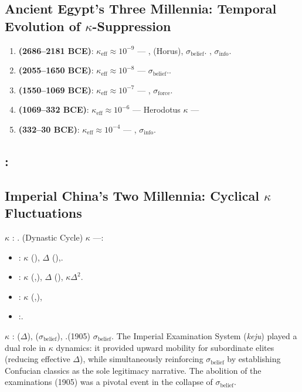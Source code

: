 \documentclass[11pt,a4paper]{article}
\theoremstyle{definition}
\newcommand{\coupling}{\kappa}
\newcommand{\suppress}{\sigma}
\begin{document}
\subsection{Ancient Egypt's Three Millennia: Temporal Evolution of $\coupling$-Suppression}
\begin{enumerate}
 \item \textbf{ (2686--2181 BCE)}: 
 $\coupling_{\text{eff}} \approx 10^{-9}$ ---
, (Horus), $\suppress_{\text{belief}}$.
, $\suppress_{\text{info}}$.
 \item \textbf{ (2055--1650 BCE)}: 
 $\coupling_{\text{eff}} \approx 10^{-8}$ ---
 $\suppress_{\text{belief}}$..
 \item \textbf{ (1550--1069 BCE)}: 
 $\coupling_{\text{eff}} \approx 10^{-7}$ ---
, $\suppress_{\text{force}}$.
 \item \textbf{ (1069--332 BCE)}: 
 $\coupling_{\text{eff}} \approx 10^{-6}$ ---
 Herodotus $\coupling$ ---
 \item \textbf{ (332--30 BCE)}: 
 $\coupling_{\text{eff}} \approx 10^{-4}$ ---
, $\suppress_{\text{info}}$.
\end{enumerate}
\subsection{:}
\subsection{Imperial China's Two Millennia: Cyclical $\coupling$ Fluctuations}
 $\coupling$ : .
(Dynastic Cycle) $\coupling$ ---: 
\begin{itemize}
 \item : $\coupling$ (), 
 $\Delta$ (),.
 \item : $\coupling$ (,), 
 $\Delta$ (), $\coupling \Delta^2$.
 \item : $\coupling$ (,), 
 \item :.
\end{itemize}
 $\coupling$ : 
($\Delta$), 
($\suppress_{\text{belief}}$), 
.(1905) $\suppress_{\text{belief}}$.
The Imperial Examination System (\textit{keju}) played a dual role in $\coupling$ dynamics:
it provided upward mobility for subordinate elites (reducing effective $\Delta$), while
simultaneously reinforcing $\suppress_{\text{belief}}$ by establishing Confucian classics
as the sole legitimacy narrative. The abolition of the examinations (1905) was a pivotal
event in the collapse of $\suppress_{\text{belief}}$.
\end{document}
